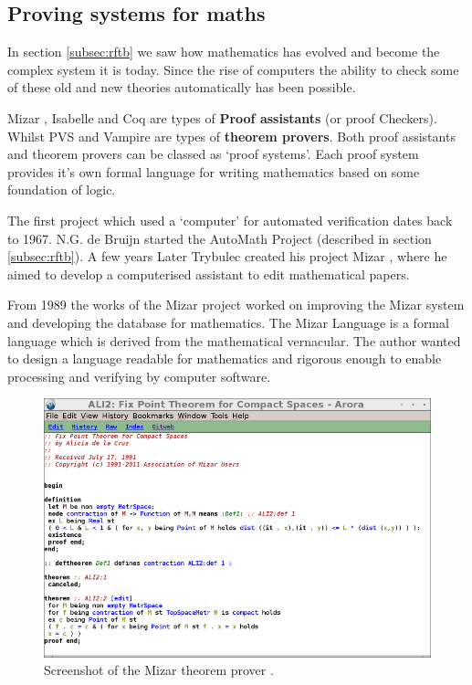 \subsection{Proving systems for maths}

In section \ref{subsec:rftb} we saw how mathematics has evolved and become the complex system it is today. Since the rise of computers the ability to check some of these old and new theories automatically has been possible.

Mizar \cite{mizar}, Isabelle \cite{isabelle} and Coq \cite{coq} are types of \textbf{Proof assistants} (or proof Checkers). Whilst PVS and Vampire are types of \textbf{theorem provers}. Both proof assistants and theorem provers can be classed as `proof systems'.
Each proof system provides it's own formal language for writing mathematics based on some foundation of logic.

The first project which used a `computer' for automated verification dates back to 1967. N.G. de Bruijn started the AutoMath Project (described in section \ref{subsec:rftb}). A few years Later Trybulec created his project Mizar \cite{mizar}, where he aimed to develop a computerised assistant to edit mathematical papers.

From 1989 the works of the Mizar project worked on improving the Mizar system and developing the database for mathematics. The Mizar Language is a formal language which is derived from the mathematical vernacular. The author wanted to design a language readable for mathematics and rigorous enough to enable processing and verifying by computer software.

\begin{figure}[H]
\begin{center}
\includegraphics[scale=0.5]{Figures/Background/mizar.png}
\end{center}
\caption{Screenshot of the Mizar theorem prover \cite{mizar}. \label{fig:mizar}}
\end{figure}

